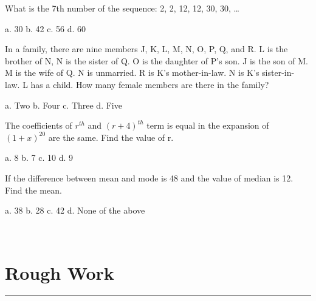 \documentclass[a4paper, addpoints]{exam}
\begin{document}
\begin{questions}
	\question What is the 7th number of the sequence: 2, 2, 12, 12, 30, 30, …\\
	
	\begin{oneparcheckboxes}
		\choice a. 30
		\choice b. 42
		\choice c. 56
		\choice d. 60
	\end{oneparcheckboxes}
	
	\question In a family, there are nine members J, K, L, M, N, O, P, Q, and R. L is the brother of N, N is the sister of Q. O is the daughter of P's son. J is the son of M. M is the wife of Q. N is unmarried. R is K's mother-in-law. N is K's sister-in- law. L has a child.
How many female members are there in the family?\\

	\begin{oneparcheckboxes}
		\choice a. Two
		\choice b. Four
		\choice c. Three
		\choice d. Five
	\end{oneparcheckboxes}
	\question The coefficients of $r^{th}$ and $(r+4)^{th}$ term is equal in the expansion of $(1+x)^{20}$ are the same. Find the value of r.\\

	\begin{oneparcheckboxes}
		\choice a. 8
		\choice b. 7
		\choice c. 10
		\choice d. 9
	\end{oneparcheckboxes}
	
	\question If the difference between mean and mode is 48 and the value of median is 12. Find the mean.\\
	
	\begin{oneparcheckboxes}
		\choice a. 38
		\choice b. 28
		\choice c. 42
		\choice d. None of the above
	\end{oneparcheckboxes}\\
	\section*{{Rough Work}}
	\hrule
\end{questions}
\end{document}

